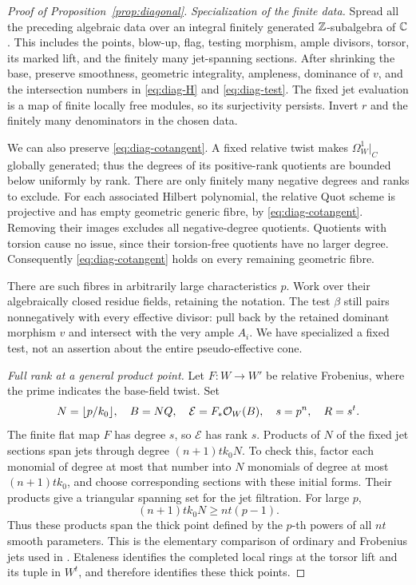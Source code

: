 \begin{proof}[Proof of Proposition~\ref{prop:diagonal}]
\medskip\noindent\emph{Specialization of the finite data.}
Spread all the preceding algebraic data over an integral finitely
generated $\mathbb Z$-subalgebra of $\mathbb C$. This includes the points, blow-up,
flag, testing morphism, ample divisors, torsor, its marked lift,
and the finitely many jet-spanning sections. After shrinking the
base, preserve smoothness, geometric integrality, ampleness,
dominance of $v$, and the intersection numbers in
\eqref{eq:diag-H} and \eqref{eq:diag-test}. The fixed jet evaluation
is a map of finite locally free modules, so its surjectivity persists.
Invert $r$ and the finitely many denominators in the chosen data.

We can also preserve \eqref{eq:diag-cotangent}. A fixed relative
twist makes $\Omega_W^1|_C$ globally generated; thus the degrees of
its positive-rank quotients are bounded below uniformly by rank.
There are only finitely many negative degrees and ranks to exclude.
For each associated Hilbert polynomial, the relative Quot scheme
is projective and has empty geometric generic fibre, by
\eqref{eq:diag-cotangent}. Removing their images excludes all
negative-degree quotients. Quotients with torsion cause no issue,
since their torsion-free quotients have no larger degree.
Consequently \eqref{eq:diag-cotangent} holds on every remaining
geometric fibre.

There are such fibres in arbitrarily large characteristics $p$.
Work over their algebraically closed residue fields, retaining the
notation. The test $\beta$ still pairs nonnegatively with every
effective divisor: pull back by the retained dominant morphism $v$
and intersect with the very ample $A_i$. We have specialized a
fixed test, not an assertion about the entire pseudo-effective cone.

\medskip\noindent\emph{Full rank at a general product point.}
Let $F:W\to W'$ be relative Frobenius, where the prime indicates
the base-field twist. Set
\begin{equation}\label{eq:diag-ranks}
 N=\lfloor p/k_0\rfloor,\quad B=NQ,\quad
 \mathcal E=F_*\mathcal O_W(B),\quad s=p^n,\quad R=s^t.
\end{equation}
The finite flat map $F$ has degree $s$, so $\mathcal E$ has rank $s$.
Products of $N$ of the fixed jet sections span jets through degree
$(n+1)t k_0N$. To check this, factor each monomial of degree at
most that number into $N$ monomials of degree at most
$(n+1)t k_0$, and choose corresponding sections with these initial
forms. Their products give a triangular spanning set for the jet
filtration. For large $p$,
\[
 (n+1)t k_0N\ge nt(p-1).
\]
Thus these products span the thick point defined by the $p$-th powers
of all $nt$ smooth parameters. This is the elementary comparison
of ordinary and Frobenius jets used in
\cite[Proposition~2.12]{MustataSchwede2014}. Etaleness identifies
the completed local rings at the torsor lift and its tuple in $W^t$,
and therefore identifies these thick points.


\end{proof}
